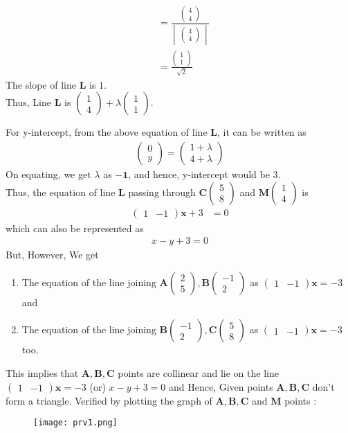 \documentclass[journal,12pt,twocolumn]{IEEEtran}
\let\vec\mathbf
\newcommand{\mydet}[1]{\ensuremath{\begin{vmatrix}#1\end{vmatrix}}}
\newcommand{\myvec}[1]{\ensuremath{\begin{pmatrix}#1\end{pmatrix}}}
\begin{document}
\begin{enumerate}
\begin{align}
   &= \frac{\myvec{4\\4}}{\mydet{\myvec{4\\4}}}\\
   &= \frac{\myvec{1\\1}}{\sqrt{2}}
\end{align}
The slope of line $\vec{L}$ is $1$.
\\
Thus, Line $\vec{L}$ is $\myvec{1\\4} + \lambda\myvec{1\\1}$. 

 For y-intercept, from the above equation of line $\vec{L}$, it can be written as
 \begin{align}
     \myvec{0\\y} = \myvec{1+\lambda\\4+\lambda} 
 \end{align}
On equating, we get $\lambda$ as $\vec{-1}$, and hence, y-intercept would be $3$.
\\
Thus, the equation of line $\vec{L}$ passing through  $\vec{C}\myvec{5\\8}$ and $\vec{M}\myvec{1\\4}$ is 
\begin{align}
    \myvec{1 & - 1}\vec{x} + 3 &= 0
\end{align}
 which can also be represented as 
 \begin{align}
     x-y+3=0
 \end{align}
 \newpage
{\large But, However,}
We get
\newline
\begin{enumerate}
    \item The equation of the line joining $\vec{A}\myvec{2\\5}, \vec{B}\myvec{-1\\2}$ as $\myvec{1 & - 1}\vec{x} = -3$ and 
    \newline
    \item The equation of the line joining $\vec{B}\myvec{-1\\2}, \vec{C}\myvec{5\\8}$ as $\myvec{1 & - 1}\vec{x}=-3$ too.\newline
\end{enumerate}
 This implies that $\vec{A,B,C}$ points are collinear and lie on the line $\myvec{1 & - 1}\vec{x} = -3$ (or) $x-y+3=0$ and Hence, Given points $\vec{A,B,C}$ don't form a triangle.
\newline
\large Verified by plotting the graph of $\vec{A,B,C}$ and $\vec{M}$ points :

\begin{figure}[ht!]
\centering
\texttt{[image: prv1.png]}
\end{figure}

\end{enumerate}
\end{document}
